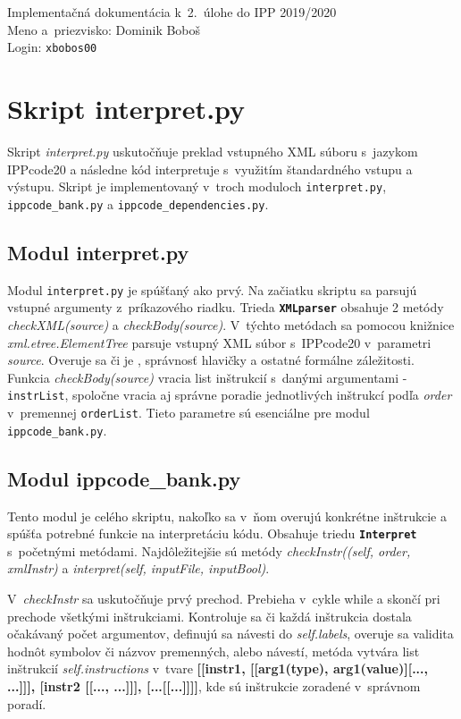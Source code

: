 \documentclass[11pt, a4paper]{article}
\begin{document}
    {\parindent 0pt \Large
        Implementačná dokumentácia k~2.~úlohe do IPP 2019/2020\\
        Meno a~priezvisko: Dominik Boboš \\
        Login: \texttt{xbobos00}
    }
    
    \section{Skript interpret.py}
Skript \emph{interpret.py} uskutočňuje preklad vstupného XML súboru s~jazykom IPPcode20 a následne kód interpretuje s~využitím štandardného vstupu a výstupu. Skript je implementovaný v~troch moduloch \texttt{interpret.py}, \texttt{ippcode\_bank.py} a \texttt{ippcode\_dependencies.py}.
    
    	\subsection{Modul interpret.py}
    Modul \texttt{interpret.py} je spúšťaný ako prvý. Na začiatku skriptu sa parsujú vstupné argumenty z~príkazového riadku. Trieda \textbf{\texttt{XMLparser}} obsahuje 2 metódy \emph{checkXML(source)} a \emph{checkBody(source)}. V~týchto metódach sa pomocou knižnice \emph{xml.etree.ElementTree} parsuje vstupný XML súbor s~IPPcode20 v~parametri \emph{source}. Overuje sa či je , správnosť hlavičky a ostatné formálne záležitosti. Funkcia \emph{\-checkBody(source)} vracia list inštrukcií s~danými argumentami - \texttt{instrList}, spoločne vracia aj správne poradie jednotlivých inštrukcí podľa \emph{order} v~premennej \texttt{orderList}. Tieto parametre sú esenciálne pre modul \texttt{ippcode\_bank.py}.
    
    	\subsection{Modul ippcode\_bank.py}
    	Tento modul je  celého skriptu, nakoľko sa v~ňom overujú konkrétne inštrukcie a spúšťa potrebné funkcie na interpretáciu kódu. Obsahuje triedu \textbf{\texttt{Interpret}} s~početnými metódami. 
Najdôležitejšie sú metódy \emph{checkInstr((self, order, xmlInstr)} a \emph{interpret(self, inputFile, inputBool)}. 

V~\emph{checkInstr} sa uskutočňuje prvý prechod. Prebieha v~cykle while a skončí pri prechode všetkými inštrukciami. Kontroluje sa či každá inštrukcia dostala očakávaný počet argumentov, definujú sa návesti do \emph{self.labels}, overuje sa validita hodnôt symbolov či názvov premenných, alebo návestí, metóda vytvára list inštrukcií \emph{self.instructions} v~tvare {\bf[[instr1, [[arg1(type), arg1(value)][..., ...]]], [instr2 [[..., ...]]], [...[[...]]]]}, kde sú inštrukcie zoradené v~správnom poradí. 
\end{document}
